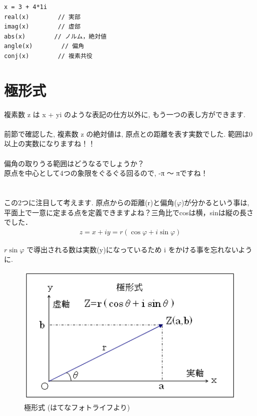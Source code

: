 \documentclass[11pt,a4paper]{jreport}
\begin{document}
\begin{lstlisting}[caption=式(\ref{eq:vector}\ref{eq:conj})あたりのコード,label=sc:vector]
x = 3 + 4*1i
real(x)        // 実部
imag(x)        // 虚部
abs(x)        // ノルム，絶対値
angle(x)        // 偏角
conj(x)        // 複素共役
\end{lstlisting}

\section{極形式}
複素数 z は x + yi のような表記の仕方以外に, もう一つの表し方ができます.\\
\\
前節で確認した, 複素数 z の絶対値は, 原点との距離を表す実数でした. 範囲は0以上の実数になりますね！！\\
\\
偏角の取りうる範囲はどうなるでしょうか？\\
原点を中心として4つの象限をぐるぐる回るので, -π ～ πですね！\\
\\
\\
この2つに注目して考えます. 原点からの距離(r)と偏角($\varphi$)が分かるという事は, 平面上で一意に定まる点を定義できますよね？三角比でcosは横，sinは縦の長さでした．
\begin{eqnarray}
z = x + iy = r(\cos \varphi + i\sin \varphi)
\label{eq:kyoku}
\end{eqnarray}

$r\sin\varphi$ で導出される数は実数(y)になっているため i をかける事を忘れないように.\\

\begin{figure}[H]
\label{im:polar}
  \centering
  \includegraphics[width=120mm,bb=0 0 406 246]{../figures/polar.png}
  \caption{極形式 (はてなフォトライフより)}
\end{figure}
\end{document}

